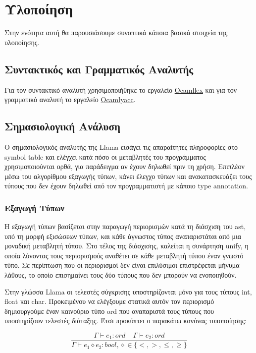 \documentclass[12pt]{article}
\newcommand{\Llama}{\textsf{Llama }}
\begin{document}
\section{Υλοποίηση}
Στην ενότητα αυτή θα παρουσιάσουμε συνοπτικά κάποια βασικά στοιχεία της υλοποίησης.
\subsection{Συντακτικός και Γραμματικός Αναλυτής}
Για τον συντακτικό αναλυτή χρησιμοποιήθηκε το εργαλείο \href{http://courses.softlab.ntua.gr/compilers/2012a/ocamlyacc-tutorial.pdf}{Ocamllex} και για τον γραμματικό     αναλυτή το εργαλείο \href{http://courses.softlab.ntua.gr/compilers/2012a/ocamlyacc-tutorial.pdf}{Ocamlyacc}.


\subsection{Σημασιολογική Ανάλυση}
Ο σημασιολογικός αναλυτής της \Llama εισάγει τις απαραίτητες πληροφορίες στο symbol table και ελέγχει κατά πόσο οι μεταβλητές του προγράμματος χρησιμοποιούνται ορθά, για παράδειγμα αν έχουν δηλωθεί πριν τη χρήση. Επιπλέον μέσω του αλγορίθμου εξαγωγής τύπων, κάνει έλεγχο τύπων και ανακατασκευάζει τους τύπους που δεν έχουν δηλωθεί από τον προγραμματιστή με κάποιο type annotation.


\subsubsection{Εξαγωγή Τύπων}
Η εξαγωγή τύπων βασίζεται στην παραγωγή περιορισμών κατά τη διάσχιση του ast, υπό τη μορφή εξισώσεων τύπων, και κάθε άγνωστος τύπος αναπαριστάται από μια μοναδική μεταβλητή τύπου. Στο τέλος της διάσχισης, καλείται η συνάρτηση unify, η οποία λύνοντας τους περιορισμούς αναθέτει σε κάθε μεταβλητή τύπου έναν γνωστό τύπο. Σε περίπτωση που οι περιορισμοί δεν είναι επιλύσιμοι επιστρέφεται μήνυμα λάθους, το οποίο επισημαίνει τους δύο τύπους που δεν μπορούν να ενοποιηθούν.


Στην γλώσσα \Llama οι τελεστές σύγκρισης υποστηρίζονται μόνο για τους τύπους int, float και char. Προκειμένου να ελέγξουμε στατικά αυτόν τον περιορισμό δημιουργούμε έναν καινούριο τύπο ord που αναπαριστά τους τύπους που υποστηρίζουν τελεστές διάταξης. Έτσι προκύπτει ο παρακάτω κανόνας τυποποίησης:

$$\frac{\Gamma  \vdash e_1 : ord \;\;\;\; \Gamma  \vdash e_2 : ord  }{\Gamma  \vdash e_1 \diamond e_2 : bool,\diamond \in \lbrace <,>, \leq, \geq\rbrace}$$
\end{document}
